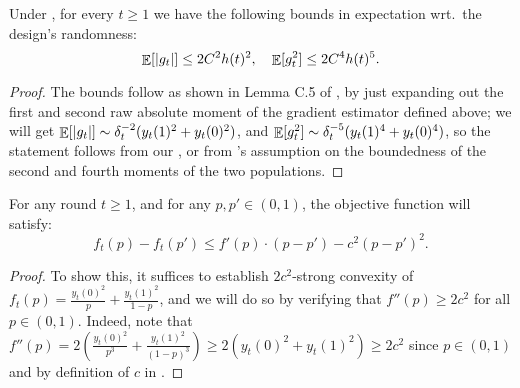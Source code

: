 \begin{claim} \label{claim:moments}
    Under , for every $t \geq 1$ we have the following bounds in expectation wrt.\ the design's randomness: \[\mathop{\mathbb{E}}[|g_t|] \leq 2 C^2 h(t)^2, \quad \mathop{\mathbb{E}}[g_t^2] \leq 2 C^4 h(t)^5.\]
\end{claim}
\begin{proof}
    The bounds follow as shown in Lemma C.5 of \citet{dai2023clip}, by just expanding out the first and second raw absolute moment of the gradient estimator defined above; we will get $\mathop{\mathbb{E}}[|g_t|] \sim \delta^{-2}_t (y_t(1)^2 + y_t(0)^2)$, and $\mathop{\mathbb{E}}[g_t^2] \sim \delta^{-5}_t (y_t(1)^4 + y_t(0)^4)$, so the statement follows from our , or from \citet{dai2023clip}'s assumption on the boundedness of the second and fourth moments of the two populations.
\end{proof}

\begin{claim} \label{claim:strong}
For any round $t \geq 1$, and for any $p, p' \in (0, 1)$, the objective function will satisfy:
\[
f_t(p) - f_t(p') \leq f'(p) \cdot (p - p') - c^2 (p-p')^2.
\]
\end{claim}
\begin{proof}
    To show this, it suffices to establish $2c^2$-strong convexity of $f_t(p) = \frac{y_t(0)^2}{p} + \frac{y_t(1)^2}{1-p}$, and we will do so by verifying that $f''(p) \geq 2c^2$ for all $p \in (0, 1)$. Indeed, note that $f''(p) = 2 \left(\frac{y_t(0)^2}{p^3} + \frac{y_t(1)^2}{(1-p)^3} \right) \geq 2(y_t(0)^2 + y_t(1)^2) \geq 2c^2$ since $p \in (0, 1)$ and by definition of $c$ in .
\end{proof}

